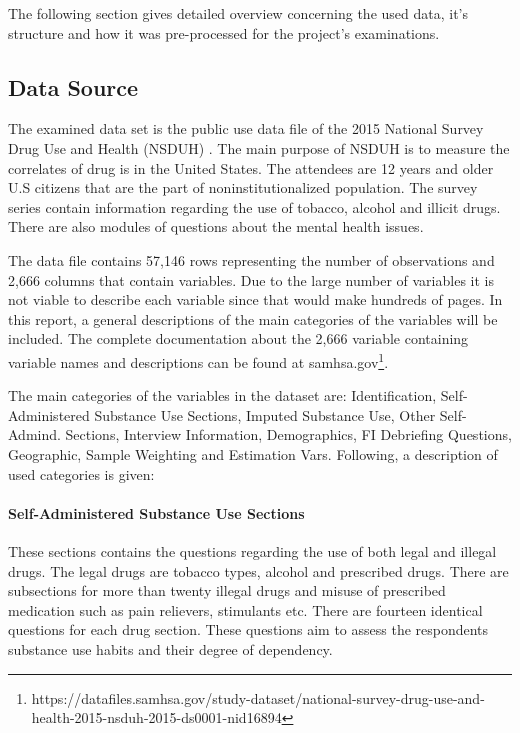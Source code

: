 \documentclass[12pt]{article}
\begin{document}
The following section gives detailed overview concerning the used data, it's structure and how it was pre-processed for the project's examinations.

\subsection{Data Source}
The examined data set is the public use data file of the 2015 National Survey Drug Use and Health (NSDUH) . The main purpose of NSDUH is to measure the correlates of drug is in the United States. The attendees are 12 years and older U.S citizens that are the part of noninstitutionalized population. The survey series contain information regarding the use of tobacco, alcohol and illicit drugs. There are also modules of questions about the mental health issues. 

The data file contains 57,146 rows representing the number of observations and 2,666 columns that contain variables. Due to the large number of variables it is not viable to describe each variable since that would make hundreds of pages. In this report, a general descriptions of the main categories of the variables will be included. The complete documentation about the 2,666 variable containing variable names and descriptions can be found at samhsa.gov\footnote{https://datafiles.samhsa.gov/study-dataset/national-survey-drug-use-and-health-2015-nsduh-2015-ds0001-nid16894}.

The main categories of the variables in the dataset are: Identification, Self-Administered Substance Use Sections, Imputed Substance Use, Other Self-Admind. Sections, Interview Information, Demographics, FI Debriefing Questions, Geographic, Sample Weighting and Estimation Vars.  Following, a description of used categories is given:

\paragraph{Self-Administered Substance Use Sections}
These sections contains the questions regarding the use of both legal and illegal drugs. The legal drugs are tobacco types, alcohol and prescribed drugs. There are subsections for more than twenty illegal drugs and misuse of prescribed medication such as pain relievers, stimulants etc. There are fourteen identical questions for each drug section. These questions aim to assess the respondents substance use habits and their degree of dependency.
\end{document}
